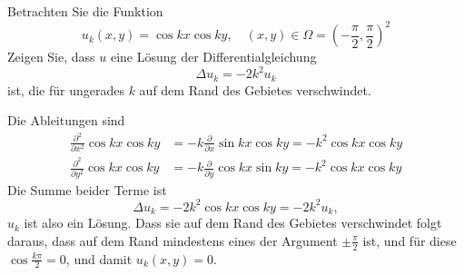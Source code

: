 Betrachten Sie die Funktion
\[
u_k(x,y)
=
\cos kx\cos ky,\quad (x,y)\in\Omega=\left(-\frac{\pi}2,\frac{\pi}2\right)^2
\]
Zeigen Sie, dass $u$ eine Lösung der Differentialgleichung
\[
\Delta u_k=-2k^2 u_k
\]
ist, die für ungerades $k$ auf dem Rand des Gebietes verschwindet.

\begin{loesung}
Die Ableitungen sind
\begin{align*}
\frac{\partial^2}{\partial x^2}\cos kx\cos ky
&=
-k\frac{\partial}{\partial x}\sin kx\cos ky
=
-k^2\cos kx\cos ky
\\
\frac{\partial^2}{\partial y^2}\cos kx\cos ky
&=
-k\frac{\partial}{\partial y}\cos kx\sin ky
=
-k^2\cos kx\cos ky
\end{align*}
Die Summe beider Terme ist
\[
\Delta u_k=-2k^2 \cos kx\cos ky=-2k^2u_k,
\]
$u_k$ ist also ein Lösung. Dass sie auf dem Rand des Gebietes
verschwindet folgt daraus, dass auf dem Rand mindestens eines
der Argument $\pm\frac{\pi}2$ ist, und für diese $\cos \frac{k\pi}2=0$,
und damit $u_k(x,y)=0$.
\end{loesung}
